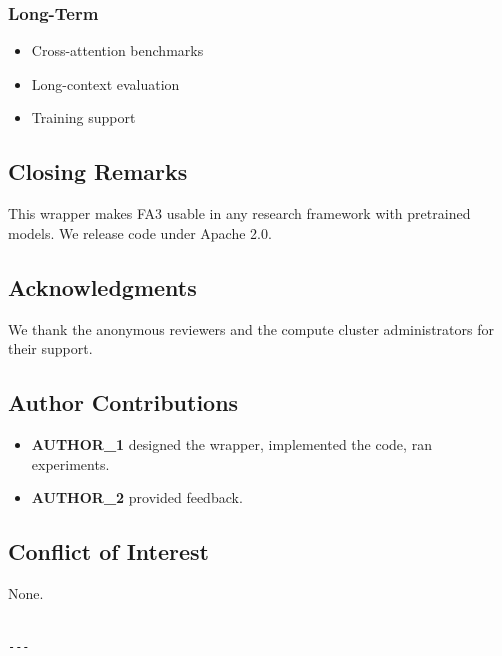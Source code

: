 \subsubsection{Long-Term}
\begin{itemize}
\item Cross-attention benchmarks
\item Long-context evaluation
\item Training support

\end{itemize}
\subsection{Closing Remarks}

This wrapper makes FA3 usable in any research framework with pretrained 
models. We release code under Apache 2.0.

\subsection{Acknowledgments}

We thank the anonymous reviewers and the compute cluster administrators for their support.

\subsection{Author Contributions}

\begin{itemize}
\item \textbf{{{AUTHOR\_1}}} designed the wrapper, implemented the code, ran experiments.
\item \textbf{{{AUTHOR\_2}}} provided feedback.

\end{itemize}
\subsection{Conflict of Interest}

None.
\begin{lstlisting}

---
\end{lstlisting}